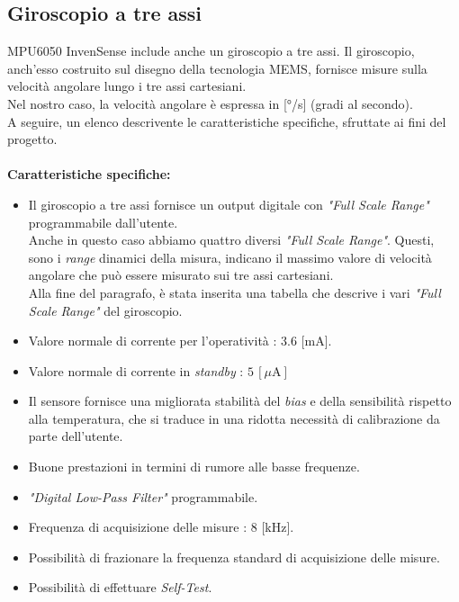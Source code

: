 \documentclass[11pt]{report}
\begin{document}
\subsection{Giroscopio a tre assi}
MPU6050 InvenSense include anche un giroscopio a tre assi. Il giroscopio, anch'esso costruito sul disegno della tecnologia MEMS, fornisce misure sulla velocità angolare lungo i tre assi cartesiani.\\
Nel nostro caso, la velocità angolare è espressa in [°/s] (gradi al secondo).\\
A seguire, un elenco descrivente le caratteristiche specifiche, sfruttate ai fini del progetto.\\\\
\textbf{Caratteristiche specifiche:}
\begin{itemize}
\item Il giroscopio a tre assi fornisce un output digitale con \textit{"Full Scale Range"} programmabile dall'utente.\\Anche in questo caso abbiamo quattro diversi \textit{"Full Scale Range"}. Questi, sono i \textit{range} dinamici della misura, indicano il massimo valore di velocità angolare che può essere misurato sui tre assi cartesiani.\\Alla fine del paragrafo, è stata inserita una tabella che descrive i vari \textit{"Full Scale Range"} del giroscopio.
\item Valore normale di corrente per l'operatività : 3.6 [mA].
\item Valore normale di corrente in \textit{standby} : $5\,[\mu\text{A}]$
\item Il sensore fornisce una migliorata stabilità del \textit{bias} e della sensibilità rispetto alla temperatura, che si traduce in una ridotta necessità di calibrazione da parte dell'utente.
\item Buone prestazioni in termini di rumore alle basse frequenze.
\item \textit{"Digital Low-Pass Filter"} programmabile.
\item Frequenza di acquisizione delle misure : 8 [kHz].
\item Possibilità di frazionare la frequenza standard di acquisizione delle misure.
\item Possibilità di effettuare \textit{Self-Test}.
\end{itemize}
\end{document}
